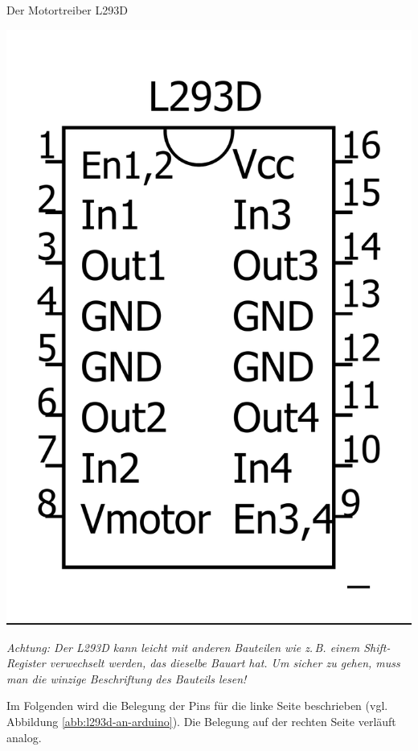 \begin{zsfg}{Der Motortreiber L293D}
\begin{minipage}{0.28\textwidth}
\begin{minipage}{0.48\textwidth}
		\end{minipage}
		\hfill
		\begin{minipage}{0.48\textwidth}
			\centering
			\includegraphics[width=\textwidth]{./Zeichnungen/motortreiber-l293d.png}
		\end{minipage}
	\end{minipage}
	
	\medskip		
	\emph{Achtung: Der L293D kann leicht mit anderen Bauteilen wie z.\,B. einem Shift-Register verwechselt werden, das dieselbe Bauart hat. Um sicher zu gehen, muss man die winzige Beschriftung des Bauteils lesen!}
\end{zsfg}

Im Folgenden wird die Belegung der Pins für die linke Seite beschrieben (vgl. Abbildung \ref{abb:l293d-an-arduino}). Die Belegung auf der rechten Seite verläuft analog.

